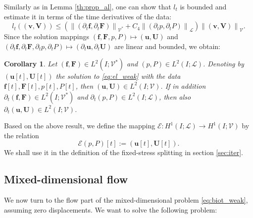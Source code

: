 \documentclass[a4paper]{article}
\newtheorem{corollary}[theorem]{Corollary}
\numberwithin{equation}{section}
\def\dt{\prtl_t}
\def\FF{\vc F}
\def\ff{\vc f}
\def\Hf{\mathscr{L}} %
\def\norm#1{\left\|#1\right\|}
\def\prtl{\partial}
\def\U{\vc U}
\def\uu{\vc u}
\def\V{\vc V}
\def\Vel{{\boldsymbol{\mathcal V}}} %
\def\Vf{{\mathcal V}} %
\def\vc#1{\mathbf{#1}}     %
\def\vv{\vc v}
\newcommand{\eqs}[1]{\begin{equation*}#1\end{equation*}}
\begin{document}
Similarly as in Lemma \ref{th:prop_al}, one can show that $l_t$ is bounded and estimate it in terms of the time derivatives of the data:
\eqs{ l_t((\vv,\V)) \le \left(\norm{(\dt\ff,\dt\FF)}_{\Vel^*} + C_4\norm{(\dt p,\dt P)}_\Hf\right)\norm{(\vv,\V)}_\Vel. }
Since the solution mappings $(\ff,\FF,p,P) \mapsto (\uu, \U)$ and $(\dt\ff,\dt\FF,\dt p,\dt P)\mapsto(\dt\uu,\dt\U)$ are linear and bounded, we obtain:
\begin{corollary}
Let $(\ff,\FF)\in L^2( I;\Vel^*)$ and $(p,P)\in L^2( I;\Hf)$.
Denoting by $(\uu[t],\U[t])$ the solution to \eqref{eq:el_weak} with the data $\ff[t],\FF[t],p[t],P[t]$, then $(\uu,\U)\in L^2( I;\Vel)$.
If in addition $\dt(\ff,\FF)\in L^2( I;\Vel^*)$ and $\dt(p,P)\in L^2( I;\Hf)$, then also $\dt(\uu,\U)\in L^2( I;\Vel)$.
\end{corollary}
% 
Based on the above result, we define the mapping $\mathcal E: H^1( I;\Hf)\to H^1( I;\Vel)$ by the relation
\eqs{ \mathcal E(p,P)[t] := (\uu[t],\U[t]). }
We shall use it in the definition of the fixed-stress splitting in section \ref{sec:iter}.


\subsection{Mixed-dimensional flow}\label{sec:wellposedness_flow}

We now turn to the flow part of the mixed-dimensional problem \eqref{eq:biot_weak}, assuming zero displacements.
We want to solve the following problem:
\end{document}
